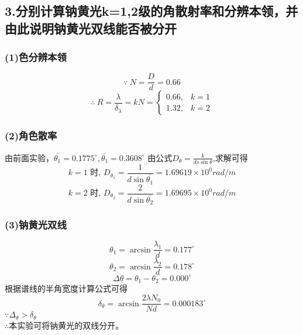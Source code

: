 \documentclass[11pt,a4paper,oneside]{article}
\begin{document}
\subsection*{3.分别计算钠黄光k=1,2级的角散射率和分辨本领，并由此说明钠黄光双线能否被分开}
\subsubsection*{(1)色分辨本领}
$$\because\ N = \displaystyle\frac{D}{d} = 0.66$$
$$\therefore\ R = \displaystyle\frac{\lambda}{ {\delta}_{\lambda}} = kN = \begin{cases} 0.66, & k=1 \\ 1.32 ,& k=2 \end{cases} $$
\subsubsection*{(2)角色散率}
由前面实验，$ \overline{ {\theta}_1} = 0.1775^{\circ}, \overline{ {\theta}_1} = 0.3608^{\circ}$
由公式$D_{\theta} = \displaystyle\frac{k}{ds\sin{\theta}}$,求解可得\\
$$k=1\text{ \ 时,\ } D_{ {\theta}_1} = \displaystyle\frac{1}{d\sin{\overline{ {\theta}_1}}} = 1.69619{\times}10^{0}rad/m$$
$$k=2\text{ \ 时,\ } D_{ {\theta}_2} = \displaystyle\frac{2}{d\sin{\overline{ {\theta}_2}}} = 1.69695{\times}10^{0}rad/m$$
\subsubsection*{(3)钠黄光双线}
$${\theta}_1 = \arcsin{\frac{ {\lambda}_1}{d}} = 0.177^{\circ}$$
$${\theta}_2 = \arcsin{\frac{ {\lambda}_2}{d}} = 0.178^{\circ}$$
$$\Delta{\theta} = {\theta}_1 - {\theta}_2 = 0.000^{\circ}$$
根据谱线的半角宽度计算公式可得
$${\delta}_{\theta} = \arcsin{\frac{2\lambda N_0}{Nd}} = 0.000183^{\circ}$$
$\because {\Delta}_{\theta} > {\delta}_{\theta} $ \\
$\therefore$本实验可将钠黄光的双线分开。
\end{document}

